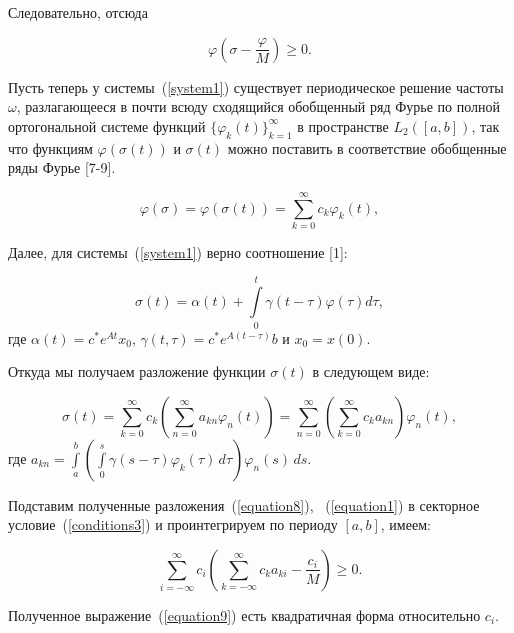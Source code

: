 \documentclass{spisok-article}
\begin{document}
Следовательно, отсюда

\begin{equation}
\label{conditions3}
\varphi (\sigma - \frac{\varphi}{M}) \geq 0.
\end{equation}

Пусть теперь у системы~(\ref{system1}) существует периодическое решение частоты $\omega$, разлагающееся в почти всюду сходящийся обобщенный ряд Фурье по полной ортогональной системе функций $\{\varphi_{k}(t)\}_{k=1}^{\infty}$ в пространстве $L_2([a,b])$, так что функциям $\varphi(\sigma(t))$ и $\sigma(t)$ можно поставить в соответствие обобщенные ряды Фурье [7-9].

\begin{equation}
\label{equation1}
\varphi(\sigma) = \varphi(\sigma(t)) = \sum\limits^{\infty}_{k=0} {c_k\varphi_k(t)},
\end{equation}

Далее, для системы~(\ref{system1}) верно соотношение [1]:

\begin{equation}
\label{equation6}
\sigma(t) = \alpha(t) + \int\limits^{t}_{0} {\gamma(t-\tau)\varphi(\tau)d\tau},
\end{equation}
где $\alpha(t) = c^{*}e^{At}x_{0}$, $\gamma(t,\tau) = c^{*}e^{A(t-\tau)}b$ и $x_{0} = x(0).$

Откуда мы получаем разложение функции $\sigma(t)$ в следующем виде:

\begin{equation}
\label{equation8}
\sigma(t) = \sum\limits^{\infty}_{k=0} {c_k\left(\sum\limits^{\infty}_{n=0} {a_{kn}\varphi_{n}(t)}\right)} = \sum\limits^{\infty}_{n=0} {\left( \sum\limits^{\infty}_{k=0} { c_{k}a_{kn} } \right)\varphi_{n}(t)},
\end{equation}
где $a_{kn} = \int\limits_a^b \left( \int\limits_0^s \gamma(s-\tau){\varphi}_k(\tau)\,d\tau\right){\varphi}_n(s)\,ds$.

Подставим полученные разложения~(\ref{equation8}), ~(\ref{equation1}) в секторное условие~(\ref{conditions3}) и проинтегрируем по периоду $[a,b]$,  имеем:

\begin{equation}
\label{equation9}
{\sum\limits^{\infty}_{i=-\infty}c_i\left({\sum\limits^{\infty}_{k=-\infty} c_k a_{ki} - \frac{c_i}{M}}\right)} \geq 0.
\end{equation}

Полученное выражение~(\ref{equation9}) есть квадратичная форма относительно $c_i$.
\end{document}
